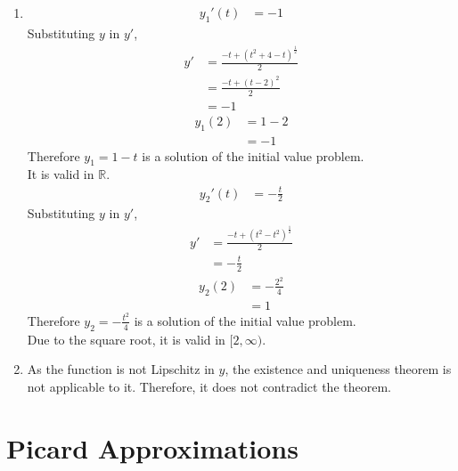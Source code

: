 \documentclass[fleqn, a4paper, 12pt, oneside]{amsart}
\theoremstyle{definition}
\theoremstyle{theorem}
\begin{document}
\begin{solution}
	\begin{enumerate}[leftmargin = *]
		\item 
			\begin{align*}
				{y_1}'(t) & = -1
			\end{align*}
			Substituting $y$ in $y'$,
			\begin{align*}
				y' & = \frac{-t + (t^2 + 4 - t)^{\frac{1}{2}}}{2} \\
                                   & = \frac{-t + (t - 2)^2}{2}                   \\
                                   & = -1
			\end{align*}
			\begin{align*}
				y_1(2) & = 1 - 2 \\
                                       & = -1
			\end{align*}
			Therefore $y_1 = 1 - t$ is a solution of the initial value problem.\\
			It is valid in $\mathbb{R}$.
			~\\
			\begin{align*}
				{y_2}'(t) & = -\frac{t}{2}
			\end{align*}
			Substituting $y$ in $y'$,
			\begin{align*}
				y' & = \frac{-t + (t^2 - t^2)^{\frac{1}{2}}}{2} \\
                                   & = -\frac{t}{2}
			\end{align*}
			\begin{align*}
				y_2(2) & = -\frac{2^2}{4} \\
                                       & = 1
			\end{align*}
			Therefore $y_2 = -\frac{t^2}{4}$ is a solution of the initial value problem.\\
			Due to the square root, it is valid in $[2,\infty)$.
		\item
			As the function is not Lipschitz in $y$, the existence and uniqueness theorem is not applicable to it.
			Therefore, it does not contradict the theorem.
	\end{enumerate}
\end{solution}

\part{Picard Approximations}
\end{document}
